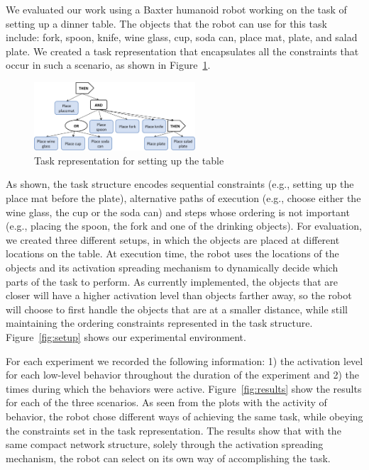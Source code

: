 \documentclass[conference]{article}
\begin{document}
We evaluated our work using a Baxter humanoid robot working on the task of setting up a dinner table. The objects that the robot can use for this task include: fork, spoon, knife, wine glass, cup, soda can, place mat, plate, and salad plate. We created a task representation that encapsulates all the constraints that occur in such a scenario, as shown in Figure~\ref{fig:set_table}. 

\begin{figure}
\centering
  \includegraphics[width=6cm]{set_table_task}
\caption{Task representation for setting up the table}
\label{fig:set_table}       %
\end{figure}

As shown, the task structure encodes sequential constraints (e.g., setting up the place mat before the plate), alternative paths of execution (e.g., choose either the wine glass, the cup or the soda can) and steps whose ordering is not important (e.g., placing the spoon, the fork and one of the drinking objects). For evaluation, we created three different setups, in which the objects are placed at different locations on the table. At execution time, the robot uses the locations of the objects and its activation spreading mechanism to dynamically decide which parts of the task to perform. As currently implemented, the objects that are closer will have a higher activation level than objects farther away, so the robot will choose to first handle the objects that are at a smaller distance, while still maintaining the ordering constraints represented in the task structure. Figure~\ref{fig:setup} shows our experimental environment.


For each experiment we recorded the following information: 1) the activation level for each low-level behavior throughout the duration of the experiment and 2) the times during which the behaviors were active. Figure~\ref{fig:results} show the results for each of the three scenarios. As seen from the plots with the activity of behavior, the robot chose different ways of achieving the same task, while obeying the constraints set in the task representation. The results show that with the same compact network structure, solely through the activation spreading mechanism, the robot can select on its own way of accomplishing the task.
\end{document}
